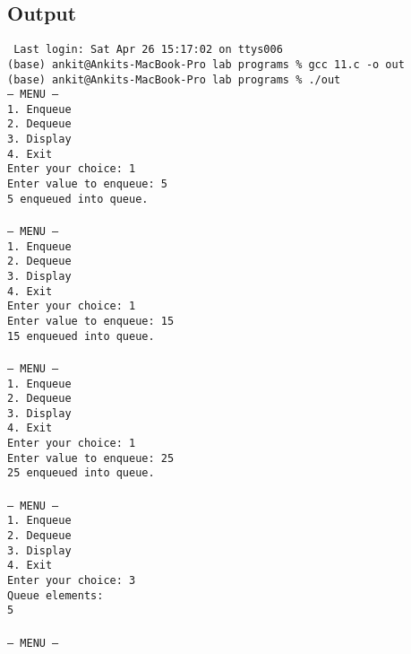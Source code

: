 \documentclass[12pt,a4paper]{article}
\begin{document}
\subsection*{Output}
\begin{tcolorbox}[terminalstyle, title=Sample Output]
\texttt{
Last login: Sat Apr 26 15:17:02 on ttys006\\
(base) ankit@Ankits-MacBook-Pro lab programs \% gcc 11.c -o out\\
(base) ankit@Ankits-MacBook-Pro lab programs \% ./out\\
--- MENU ---\\
1. Enqueue\\
2. Dequeue\\
3. Display\\
4. Exit\\
Enter your choice: 1\\
Enter value to enqueue: 5\\
5 enqueued into queue.\\
\\
--- MENU ---\\
1. Enqueue\\
2. Dequeue\\
3. Display\\
4. Exit\\
Enter your choice: 1\\
Enter value to enqueue: 15\\
15 enqueued into queue.\\
\\
--- MENU ---\\
1. Enqueue\\
2. Dequeue\\
3. Display\\
4. Exit\\
Enter your choice: 1\\
Enter value to enqueue: 25\\
25 enqueued into queue.\\
\\
--- MENU ---\\
1. Enqueue\\
2. Dequeue\\
3. Display\\
4. Exit\\
Enter your choice: 3\\
Queue elements:\\
5  \\
\\
--- MENU ---\\
}
\end{tcolorbox}
\end{document}
